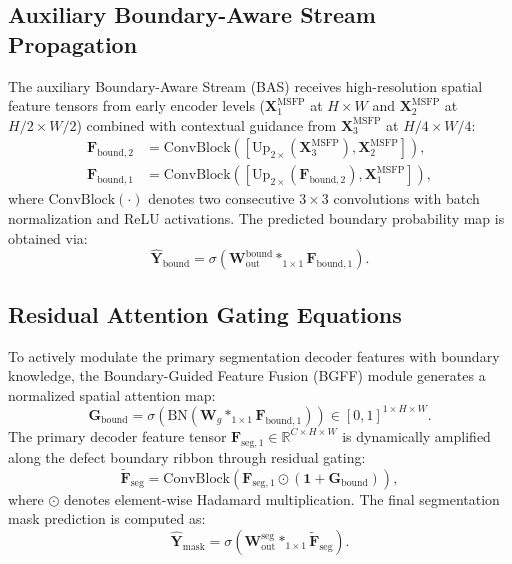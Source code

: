 \documentclass{ieeeaccess}
\begin{document}
\subsection{Auxiliary Boundary-Aware Stream Propagation}
The auxiliary Boundary-Aware Stream (BAS) receives high-resolution spatial feature tensors from early encoder levels ($\mathbf{X}_1^{\text{MSFP}}$ at $H \times W$ and $\mathbf{X}_2^{\text{MSFP}}$ at $H/2 \times W/2$) combined with contextual guidance from $\mathbf{X}_3^{\text{MSFP}}$ at $H/4 \times W/4$:
\begin{align}
  \mathbf{F}_{\text{bound}, 2} &= \text{ConvBlock}\left(\left[\text{Up}_{2\times}(\mathbf{X}_3^{\text{MSFP}}), \mathbf{X}_2^{\text{MSFP}}\right]\right), \label{eq:bas_f2} \\
  \mathbf{F}_{\text{bound}, 1} &= \text{ConvBlock}\left(\left[\text{Up}_{2\times}(\mathbf{F}_{\text{bound}, 2}), \mathbf{X}_1^{\text{MSFP}}\right]\right), \label{eq:bas_f1}
\end{align}
where $\text{ConvBlock}(\cdot)$ denotes two consecutive $3 \times 3$ convolutions with batch normalization and ReLU activations. The predicted boundary probability map is obtained via:
\begin{equation}
  \hat{\mathbf{Y}}_{\text{bound}} = \sigma\left(\mathbf{W}_{\text{out}}^{\text{bound}} *_{1\times 1} \mathbf{F}_{\text{bound}, 1}\right).
  \label{eq:bas_pred}
\end{equation}

\subsection{Residual Attention Gating Equations}
To actively modulate the primary segmentation decoder features with boundary knowledge, the Boundary-Guided Feature Fusion (BGFF) module generates a normalized spatial attention map:
\begin{equation}
  \mathbf{G}_{\text{bound}} = \sigma\left(\text{BN}\left(\mathbf{W}_g *_{1\times 1} \mathbf{F}_{\text{bound}, 1}\right)\right) \in [0, 1]^{1 \times H \times W}.
  \label{eq:bgff_gate}
\end{equation}
The primary decoder feature tensor $\mathbf{F}_{\text{seg}, 1} \in \mathbb{R}^{C \times H \times W}$ is dynamically amplified along the defect boundary ribbon through residual gating:
\begin{equation}
  \tilde{\mathbf{F}}_{\text{seg}} = \text{ConvBlock}\left(\mathbf{F}_{\text{seg}, 1} \odot (\mathbf{1} + \mathbf{G}_{\text{bound}})\right),
  \label{eq:bgff_mod}
\end{equation}
where $\odot$ denotes element-wise Hadamard multiplication. The final segmentation mask prediction is computed as:
\begin{equation}
  \hat{\mathbf{Y}}_{\text{mask}} = \sigma\left(\mathbf{W}_{\text{out}}^{\text{seg}} *_{1\times 1} \tilde{\mathbf{F}}_{\text{seg}}\right).
  \label{eq:seg_pred}
\end{equation}
\end{document}
